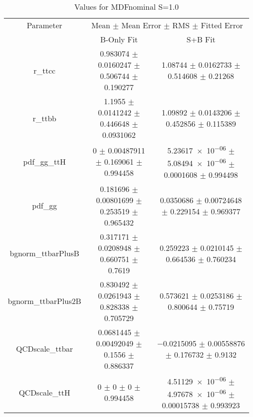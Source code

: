 \begin{table}
\centering
\caption{Values for MDFnominal S=1.0}
\begin{tabular}{ccc}
\toprule
Parameter & \multicolumn{2}{c}{Mean $\pm$ Mean Error $\pm$ RMS $\pm$ Fitted Error}\\
 & B-Only Fit & S+B Fit\\
\midrule
r\_ttcc & \num{0.983074} $\pm$ \num{0.0160247} $\pm$ \num{0.506744} $\pm$ \num{0.190277} & \num{1.08744} $\pm$ \num{0.0162733} $\pm$ \num{0.514608} $\pm$ \num{0.21268}\\
r\_ttbb & \num{1.1955} $\pm$ \num{0.0141242} $\pm$ \num{0.446648} $\pm$ \num{0.0931062} & \num{1.09892} $\pm$ \num{0.0143206} $\pm$ \num{0.452856} $\pm$ \num{0.115389}\\
pdf\_gg\_ttH & \num{0} $\pm$ \num{0.00487911} $\pm$ \num{0.169061} $\pm$ \num{0.994458} & \num{5.23617e-06} $\pm$ \num{5.08494e-06} $\pm$ \num{0.0001608} $\pm$ \num{0.994498}\\
pdf\_gg & \num{0.181696} $\pm$ \num{0.00801699} $\pm$ \num{0.253519} $\pm$ \num{0.965432} & \num{0.0350686} $\pm$ \num{0.00724648} $\pm$ \num{0.229154} $\pm$ \num{0.969377}\\
bgnorm\_ttbarPlusB & \num{0.317171} $\pm$ \num{0.0208948} $\pm$ \num{0.660751} $\pm$ \num{0.7619} & \num{0.259223} $\pm$ \num{0.0210145} $\pm$ \num{0.664536} $\pm$ \num{0.760234}\\
bgnorm\_ttbarPlus2B & \num{0.830492} $\pm$ \num{0.0261943} $\pm$ \num{0.828338} $\pm$ \num{0.705729} & \num{0.573621} $\pm$ \num{0.0253186} $\pm$ \num{0.800644} $\pm$ \num{0.75719}\\
QCDscale\_ttbar & \num{0.0681445} $\pm$ \num{0.00492049} $\pm$ \num{0.1556} $\pm$ \num{0.886337} & \num{-0.0215095} $\pm$ \num{0.00558876} $\pm$ \num{0.176732} $\pm$ \num{0.9132}\\
QCDscale\_ttH & \num{0} $\pm$ \num{0} $\pm$ \num{0} $\pm$ \num{0.994458} & \num{4.51129e-06} $\pm$ \num{4.97678e-06} $\pm$ \num{0.00015738} $\pm$ \num{0.993923}\\
\bottomrule
\end{tabular}
\end{table}